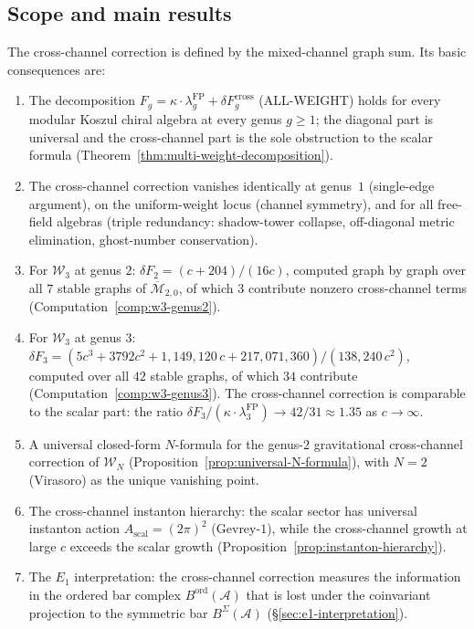 \documentclass[11pt]{article}
\theoremstyle{definition}
\theoremstyle{remark}
\newcommand{\cA}{\mathcal{A}}
\newcommand{\cM}{\mathcal{M}}
\newcommand{\Walg}{\mathcal{W}}
\newcommand{\FP}{\mathrm{FP}}
\newcommand{\cross}{\mathrm{cross}}
\newcommand{\scal}{\mathrm{scal}}
\DeclareMathOperator{\ord}{ord}
\numberwithin{equation}{section}
\begin{document}
\subsection{Scope and main results}

The cross-channel correction is defined by the mixed-channel graph
sum. Its basic consequences are:

\begin{enumerate}[label=(\arabic*)]
\item The decomposition
 $F_g = \kappa \cdot \lambda_g^{\FP}
 + \delta F_g^{\cross}$ (ALL-WEIGHT)
 holds for every modular Koszul chiral algebra at every genus
 $g \geq 1$; the diagonal part is universal and the
 cross-channel part is the sole obstruction to the scalar
 formula (Theorem~\ref{thm:multi-weight-decomposition}).

\item The cross-channel correction vanishes identically at
 genus~$1$ (single-edge argument), on the uniform-weight
 locus (channel symmetry), and for all free-field algebras
 (triple redundancy: shadow-tower collapse, off-diagonal
 metric elimination, ghost-number conservation).

\item For $\Walg_3$ at genus $2$:
 $\delta F_2 = (c{+}204)/(16c)$, computed graph by graph
 over all $7$ stable graphs of
 $\overline{\cM}_{2,0}$, of which $3$ contribute nonzero
 cross-channel terms (Computation~\ref{comp:w3-genus2}).

\item For $\Walg_3$ at genus $3$:
 $\delta F_3 = (5c^3 + 3792c^2
 + 1{,}149{,}120\,c + 217{,}071{,}360)/(138{,}240\,c^2)$,
 computed over all $42$ stable graphs, of which $34$
 contribute (Computation~\ref{comp:w3-genus3}).
 The cross-channel correction is comparable to the scalar
 part: the ratio
 $\delta F_3/(\kappa \cdot \lambda_3^{\FP})
 \to 42/31 \approx 1.35$ as $c \to \infty$.

\item A universal closed-form $N$-formula for the genus-$2$
 gravitational cross-channel correction of $\Walg_N$
 (Proposition~\ref{prop:universal-N-formula}), with
 $N = 2$ (Virasoro) as the unique vanishing point.

\item The cross-channel instanton hierarchy: the scalar
 sector has universal instanton action
 $A_{\scal} = (2\pi)^2$ (Gevrey-$1$), while the
 cross-channel growth at large $c$ exceeds the scalar
 growth (Proposition~\ref{prop:instanton-hierarchy}).

\item The $E_1$ interpretation: the cross-channel correction
measures the information in the ordered bar complex
 $B^{\ord}(\cA)$ that is lost under the coinvariant
 projection to the symmetric bar $B^{\Sigma}(\cA)$
 (\S\ref{sec:e1-interpretation}).
\end{enumerate}
\end{document}
